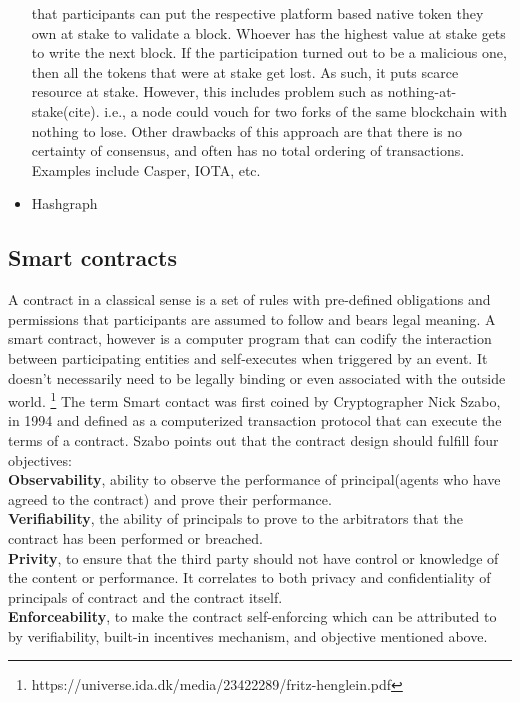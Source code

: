 \begin{itemize}
		that participants can put the respective platform based native token
		they own at stake to validate a block. Whoever has the highest value at
		stake gets to write the next block. If the participation turned out to
		be a malicious one, then all the tokens that were at stake get lost. As
		such, it puts scarce resource at stake. However, this includes problem
		such as nothing-at-stake(cite). i.e., a node could vouch for two forks
		of the same blockchain with nothing to lose. Other drawbacks of this
		approach are that there is no certainty of consensus, and often has no
		total ordering of transactions. Examples include Casper, IOTA, etc. 
	\item Hashgraph
\end{itemize}

\subsection{Smart contracts}
A contract in a classical sense is a set of rules with pre-defined obligations
and permissions that participants are assumed to follow and bears legal
meaning. A smart contract, however is a computer program that can codify the
interaction between participating entities and self-executes when triggered by
an event. It doesn't necessarily need to be legally binding or even associated
with the outside world. 
\footnote{https://universe.ida.dk/media/23422289/fritz-henglein.pdf}
The term Smart contact was first coined by Cryptographer Nick Szabo, in 1994
\cite{SzaboSmart1994} and defined as a computerized transaction protocol that
can execute the terms of a contract. Szabo points out that the contract
design should fulfill four objectives\cite{szabo1996smart}: \\
\textbf{Observability}, ability to observe the performance of principal(agents
who have agreed to the contract) and prove their performance.\\
\textbf{Verifiability}, the ability of principals to prove to the arbitrators
that the contract has been performed or breached. \\ 
\textbf{Privity}, to ensure that the third party should not have control or
knowledge of the content or performance. It correlates to both privacy and
confidentiality of principals of contract and the contract itself. \\
\textbf{Enforceability}, to make the contract self-enforcing which can be
attributed to by verifiability, built-in incentives mechanism, and objective
mentioned above. \\
